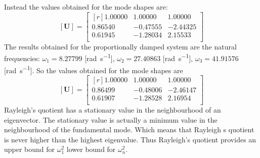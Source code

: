 Instead the values obtained for the mode shapes are:
\begin{equation}
  \label{eq:raymodefree}
  [\mathbf{U}] = \begin{bmatrix*}[r]
	1.00000 & 1.00000 & 1.00000 \\
	0.86540 &-0.47555 &-2.44325 \\
	0.61945 &-1.28034 & 2.15533 \\
  \end{bmatrix*}
\end{equation}
The results obtained for the proportionally damped system are the natural 
frequencies:
\(\omega_{1} =  8.27799\) [\si{\radian\per\second}],
\(\omega_{2} = 27.40863\) [\si{\radian\per\second}],
\(\omega_{3} = 41.91576\) [\si{\radian\per\second}].
So the values obtained for the mode shapes are
\begin{equation}\label{eq:raymodeprop}
  [\mathbf{U}] = 
	\begin{bmatrix*}[r]
  		1.00000 & 1.00000 & 1.00000 \\
		0.86499 &-0.48006 &-2.46147 \\
		0.61907 &-1.28528 & 2.16954 \\
	\end{bmatrix*}
\end{equation}
Rayleigh's quotient has a stationary value in the neighbourhood of an eigenvector. 
The stationary value is actually a minimum value in the neighbourhood of the 
fundamental mode.
Which means that Rayleigh s quotient is never higher than the highest eigenvalue. 
Thus Rayleigh's quotient provides an upper bound for \(\omega_{1}^{2}\) lower bound 
for \(\omega_{n}^{2}\).
